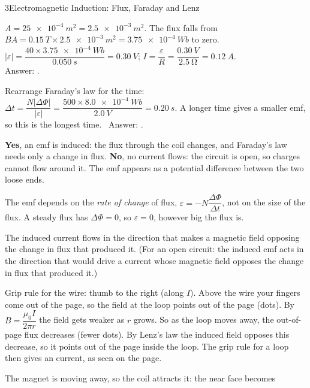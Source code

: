\begin{chapteranswers}{3}{Electromagnetic Induction: Flux, Faraday and Lenz}
  \item $A = \qty{25e-4}{m^2} = \qty{2.5e-3}{m^2}$. The flux falls from
        $BA = \qty{0.15}{T} \times \qty{2.5e-3}{m^2} = \qty{3.75e-4}{Wb}$ to zero.\\[4pt]
        $\lvert\varepsilon\rvert = \dfrac{40 \times \qty{3.75e-4}{Wb}}{\qty{0.050}{s}}
        = \qty{0.30}{V}$; \quad
        $I = \dfrac{\varepsilon}{R} = \dfrac{\qty{0.30}{V}}{\qty{2.5}{\ohm}} = \qty{0.12}{A}$.\\[4pt]
        Answer: .
  \item Rearrange Faraday's law for the time:
        $\Delta t = \dfrac{N\lvert\Delta\Phi\rvert}{\lvert\varepsilon\rvert}
        = \dfrac{500 \times \qty{8.0e-4}{Wb}}{\qty{2.0}{V}} = \qty{0.20}{s}$.
        A longer time gives a smaller emf, so this is the longest time.
        \ Answer: .
  \item \textbf{Yes}, an emf is induced: the flux through the coil changes, and
        Faraday's law needs only a change in flux. \textbf{No}, no current flows:
        the circuit is open, so charges cannot flow around it. The emf appears as a
        potential difference between the two loose ends.
  \item The emf depends on the \emph{rate of change} of flux,
        $\varepsilon = -N\dfrac{\Delta\Phi}{\Delta t}$, not on the size of the flux.
        A steady flux has $\Delta\Phi = 0$, so $\varepsilon = 0$, however big the
        flux is.
  \item The induced current flows in the direction that makes a magnetic field
        opposing the change in flux that produced it. (For an open circuit: the
        induced emf acts in the direction that would drive a current whose
        magnetic field opposes the change in flux that produced it.)
  \item Grip rule for the wire: thumb to the right (along $I$). Above the wire your
        fingers come out of the page, so the field at the loop points out of the
        page (dots). By $B = \dfrac{\mu_0 I}{2\pi r}$ the field gets weaker as $r$
        grows. So as the loop moves away, the out-of-page flux decreases (fewer
        dots). By Lenz's law the induced field opposes this decrease, so it points
        out of the page inside the loop. The grip rule for a loop then gives an
         current, as seen on the page.
  \item The magnet is moving away, so the coil attracts it: the near face becomes

\end{chapteranswers}
